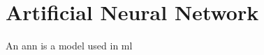 \section{Artificial Neural Network}
\label{sec:theoretical_background:ann}

An \acrlong{ann} is a model used in \acrshort{ml}


